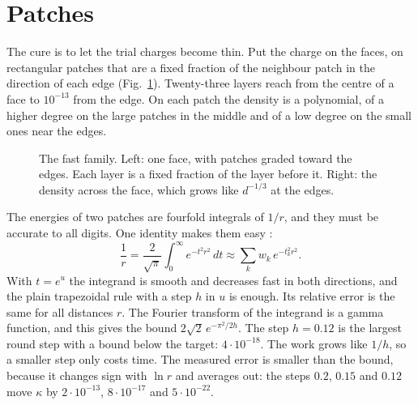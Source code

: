 \documentclass[journal]{IEEEtran}
\begin{document}
\section{Patches}
The cure is to let the trial charges become thin. Put the charge on the faces, on rectangular patches that are a fixed fraction of the neighbour patch in the direction of each edge (Fig.~\ref{fig:patches}). Twenty-three layers reach from the centre of a face to $10^{-13}$ from the edge. On each patch the density is a polynomial, of a higher degree on the large patches in the middle and of a low degree on the small ones near the edges.

\begin{figure}[!t]
\centering
{}
\caption{The fast family. Left: one face, with patches graded toward the edges. Each layer is a fixed fraction of the layer before it. Right: the density across the face, which grows like $d^{-1/3}$ at the edges.}
\label{fig:patches}
\end{figure}

The energies of two patches are fourfold integrals of $1/r$, and they must be accurate to all digits. One identity makes them easy \cite{stenger,beylkin}:
\begin{equation}
\frac1r = \frac{2}{\sqrt\pi}\int_0^\infty e^{-t^2 r^2}\,dt \approx \sum_k w_k\, e^{-t_k^2 r^2}.
\label{eq:gauss}
\end{equation}
With $t = e^u$ the integrand is smooth and decreases fast in both directions, and the plain trapezoidal rule with a step $h$ in $u$ is enough. Its relative error is the same for all distances $r$. The Fourier transform of the integrand is a gamma function, and this gives the bound $2\sqrt2\, e^{-\pi^2/2h}$. The step $h = 0.12$ is the largest round step with a bound below the target: $4\cdot10^{-18}$. The work grows like $1/h$, so a smaller step only costs time. The measured error is smaller than the bound, because it changes sign with $\ln r$ and averages out: the steps $0.2$, $0.15$ and $0.12$ move $\kappa$ by $2\cdot10^{-13}$, $8\cdot10^{-17}$ and $5\cdot10^{-22}$.
\end{document}
